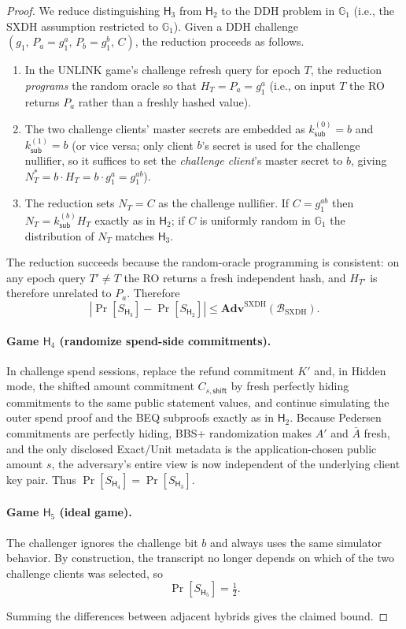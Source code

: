 \documentclass[11pt]{article}
\theoremstyle{definitionstyle}
\theoremstyle{plain}
\newcommand{\advantage}[1]{\mathbf{Adv}^{\mathrm{#1}}}
\begin{document}
\begin{proof}
We reduce distinguishing $\mathsf{H}_3$ from $\mathsf{H}_2$ to the DDH problem in $\mathbb{G}_1$ (i.e., the SXDH assumption restricted to $\mathbb{G}_1$).  Given a DDH challenge $(g_1,\, P_a = g_1^a,\, P_b = g_1^b,\, C)$, the reduction proceeds as follows.
\begin{enumerate}[leftmargin=*]
\item In the UNLINK game's challenge refresh query for epoch $T$, the reduction \emph{programs} the random oracle so that $H_T = P_a = g_1^a$ (i.e., on input $T$ the RO returns $P_a$ rather than a freshly hashed value).
\item The two challenge clients' master secrets are embedded as $k_{\mathsf{sub}}^{(0)} = b$ and $k_{\mathsf{sub}}^{(1)} = b$ (or vice versa; only client $b$'s secret is used for the challenge nullifier, so it suffices to set the \emph{challenge client}'s master secret to $b$, giving $N_T^* = b \cdot H_T = b \cdot g_1^a = g_1^{ab}$).
\item The reduction sets $N_T = C$ as the challenge nullifier.  If $C = g_1^{ab}$ then $N_T = k_{\mathsf{sub}}^{(b)} H_T$ exactly as in $\mathsf{H}_2$; if $C$ is uniformly random in $\mathbb{G}_1$ the distribution of $N_T$ matches $\mathsf{H}_3$.
\end{enumerate}
The reduction succeeds because the random-oracle programming is consistent: on any epoch query $T' \ne T$ the RO returns a fresh independent hash, and $H_{T'}$ is therefore unrelated to $P_a$.  Therefore
\[
|\Pr[S_{\mathsf{H}_3}] - \Pr[S_{\mathsf{H}_2}]| \le \advantage{SXDH}(\mathcal{B}_{\text{SXDH}}).
\]

\paragraph{Game $\mathsf{H}_4$ (randomize spend-side commitments).} In challenge spend sessions, replace the refund commitment $K'$ and, in Hidden mode, the shifted amount commitment $C_{s,\mathsf{shift}}$ by fresh perfectly hiding commitments to the same public statement values, and continue simulating the outer spend proof and the BEQ subproofs exactly as in $\mathsf{H}_2$. Because Pedersen commitments are perfectly hiding, BBS+ randomization makes $A'$ and $\bar{A}$ fresh, and the only disclosed Exact/Unit metadata is the application-chosen public amount $s$, the adversary's entire view is now independent of the underlying client key pair. Thus $\Pr[S_{\mathsf{H}_4}] = \Pr[S_{\mathsf{H}_3}]$.

\paragraph{Game $\mathsf{H}_5$ (ideal game).} The challenger ignores the challenge bit $b$ and always uses the same simulator behavior. By construction, the transcript no longer depends on which of the two challenge clients was selected, so
\[
\Pr[S_{\mathsf{H}_5}] = \tfrac12.
\]

Summing the differences between adjacent hybrids gives the claimed bound.
\end{proof}
\end{document}
